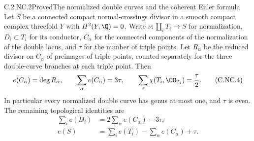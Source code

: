 \begin{statement}{C.2.NC.2}{Proved}{The normalized double curves and the coherent Euler formula}
Let $S$ be a connected compact normal-crossings divisor in a smooth compact complex threefold $Y$ with $H^2(Y,\Q)=0$. Write $\nu:\coprod_iT_i\to S$ for normalization, $D_i\subset T_i$ for its conductor, $C_\alpha$ for the connected components of the normalization of the double locus, and $\tau$ for the number of triple points. Let $R_\alpha$ be the reduced divisor on $C_\alpha$ of preimages of triple points, counted separately for the three double-curve branches at each triple point. Then
\[
 e(C_\alpha)=\deg R_\alpha,\qquad
 \sum_\alpha e(C_\alpha)=3\tau,
 \qquad
 \sum_i\chi(T_i,\OO_{T_i})=\frac{\tau}{2}.
 \tag{C.NC.4}
\]
In particular every normalized double curve has genus at most one, and $\tau$ is even. The remaining topological identities are
\[
\begin{aligned}
 \sum_i e(D_i)&=2\sum_\alpha e(C_\alpha)-3\tau,\\
 e(S)&=\sum_i e(T_i)-\sum_\alpha e(C_\alpha)+\tau.
\end{aligned}
 \tag{C.NC.5}
\]
\end{statement}
